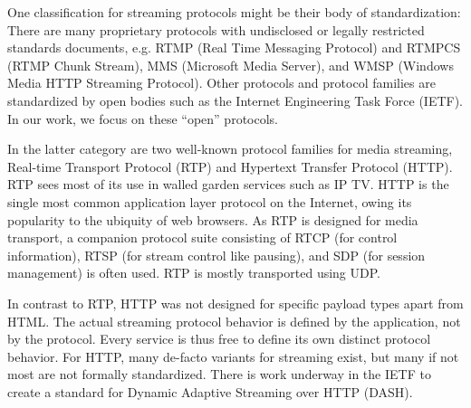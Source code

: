 One classification for streaming protocols might be their body of standardization: There are many proprietary protocols with undisclosed or legally restricted standards documents, e.g. RTMP (Real Time Messaging Protocol) and RTMPCS (RTMP Chunk Stream), MMS (Microsoft Media Server), and WMSP (Windows Media HTTP Streaming Protocol). Other protocols and protocol families are standardized by open bodies such as the Internet Engineering Task Force (IETF). In our work, we focus on these ``open'' protocols.

In the latter category are two well-known protocol families for media streaming, Real-time Transport Protocol (RTP) and Hypertext Transfer Protocol (HTTP). RTP sees most of its use in walled garden services such as IP TV. HTTP is the single most common application layer protocol on the Internet, owing its popularity to the ubiquity of web browsers. As RTP is designed for media transport, a companion protocol suite consisting of RTCP (for control information), RTSP (for stream control like pausing), and SDP (for session management) is often used. RTP is mostly transported using UDP.

In contrast to RTP, HTTP was not designed for specific payload types apart from HTML. The actual streaming protocol behavior is defined by the application, not by the protocol. Every service is thus free to define its own distinct protocol behavior. For HTTP, many de-facto variants for streaming exist, but many if not most are not formally standardized. There is work underway in the IETF to create a standard for Dynamic Adaptive Streaming over HTTP (DASH).






